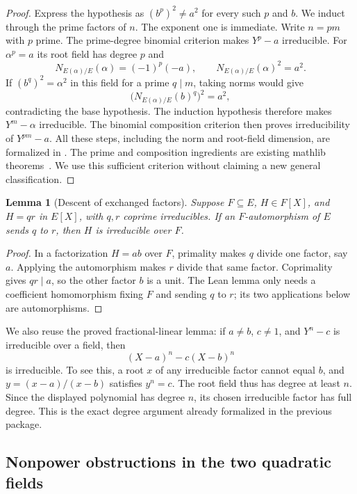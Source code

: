 \documentclass[11pt]{article}
\newtheorem{lemma}[theorem]{Lemma}
\begin{document}
\begin{proof}
Express the hypothesis as $(b^p)^2\ne a^2$ for every such $p$ and $b$.
We induct through the prime factors of $n$. The exponent one is
immediate. Write $n=pm$ with $p$ prime. The prime-degree binomial
criterion makes $Y^p-a$ irreducible. For $\alpha^p=a$ its root field
has degree $p$ and
\[
 N_{E(\alpha)/E}(\alpha)=(-1)^p(-a),\qquad
 N_{E(\alpha)/E}(\alpha)^2=a^2.
\]
If $(b^q)^2=\alpha^2$ in this field for a prime $q\mid m$, taking norms
would give
\[
 \big(N_{E(\alpha)/E}(b)^q\big)^2=a^2,
\]
contradicting the base hypothesis. The induction hypothesis therefore
makes $Y^m-\alpha$ irreducible. The binomial composition criterion
then proves irreducibility of $Y^{pm}-a$.
All these steps, including the norm and root-field dimension, are
formalized in . The prime and composition
ingredients are existing mathlib theorems~\cite{kummer}. We use this
sufficient criterion without claiming a new general classification.
\end{proof}

\begin{lemma}[Descent of exchanged factors]\label{lem:descent9}
Suppose $F\subseteq E$, $H\in F[X]$, and $H=qr$ in $E[X]$, with
$q,r$ coprime irreducibles. If an $F$-automorphism of $E$ sends $q$
to $r$, then $H$ is irreducible over $F$.
\end{lemma}

\begin{proof}
In a factorization $H=ab$ over $F$, primality makes $q$ divide one
factor, say $a$. Applying the automorphism makes $r$ divide that same
factor. Coprimality gives $qr\mid a$, so the other factor $b$ is a unit.
The Lean lemma only needs a coefficient homomorphism fixing $F$ and
sending $q$ to $r$; its two applications below are automorphisms.
\end{proof}

We also reuse the proved fractional-linear lemma: if $a\ne b$, $c\ne1$,
and $Y^n-c$ is irreducible over a field, then
\[
 (X-a)^n-c(X-b)^n
\]
is irreducible. To see this, a root $x$ of any irreducible factor cannot
equal $b$, and $y=(x-a)/(x-b)$ satisfies $y^n=c$. The root field thus
has degree at least $n$. Since the displayed polynomial has degree
$n$, its chosen irreducible factor has full degree. This is the exact
degree argument already formalized in the previous package.

\subsection{Nonpower obstructions in the two quadratic fields}
\end{document}
